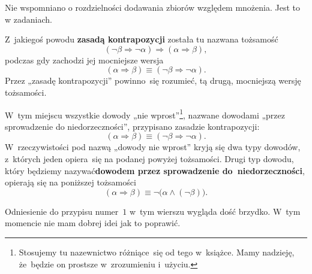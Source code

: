 \documentclass[a4paper,11pt]{article}
\begin{document}
Nie wspomniano o rozdzielności dodawania zbiorów względem mnożenia. Jest to
w zadaniach.

\noindent
{} Z~jakiegoś powodu \textbf{zasadą kontrapozycji} została tu nazwana
tożsamość
\begin{equation}
  \label{eq:Kuratowski-Wstep-do-teorii-mnogosci-ETC-01}
  ( \neg \beta \Rightarrow \neg \alpha ) \Rightarrow ( \alpha \Rightarrow \beta ),
\end{equation}
podczas gdy zachodzi jej mocniejsze wersja
\begin{equation}
  \label{eq:Kuratowski-Wstep-do-teorii-mnogosci-ETC-02}
  ( \alpha \Rightarrow \beta ) \equiv ( \neg \beta \Rightarrow \neg \alpha ).
\end{equation}
Przez „zasadę kontrapozycji” powinno~się rozumieć, tą drugą, mocniejszą
wersję tożsamości.

\vspace{\spaceFour}





\noindent
{} W~tym miejscu wszystkie dowody
„nie wprost”\footnote{Stosujemy tu nazewnictwo różniące~się od tego
  w~książce. Mamy nadzieję, że~będzie on prostsze w~zrozumieniu i~użyciu.},
nazwane dowodami „przez sprowadzenie do niedorzeczności”, przypisano
zasadzie kontrapozycji:
\begin{equation}
  \label{eq:Kuratowski-Wstep-do-teorii-mnogosci-ETC-03}
  ( \alpha \Rightarrow \beta ) \equiv ( \neg \beta \Rightarrow \neg \alpha).
\end{equation}
W~rzeczywistości pod nazwą „dowody nie wprost” kryją się dwa typy dowodów,
z~których jeden opiera~się na podanej powyżej tożsamości. Drugi typ dowodu,
który będziemy nazywać\textbf{dowodem przez sprowadzenie
  do~niedorzeczności}, opierają się na poniższej tożsamości
\begin{equation}
  \label{eq:Kuratowski-Wstep-do-teorii-mnogosci-ETC-04}
  ( \alpha \Rightarrow \beta ) \equiv \neg \big( \alpha \land ( \neg \beta ) \big).
\end{equation}

\vspace{\spaceFour}





\noindent
{} Odniesienie do przypisu numer~$1$ w~tym wierszu wygląda dość
brzydko. W~tym momencie nie mam dobrej idei jak to poprawić.

\vspace{\spaceFour}
\end{document}
